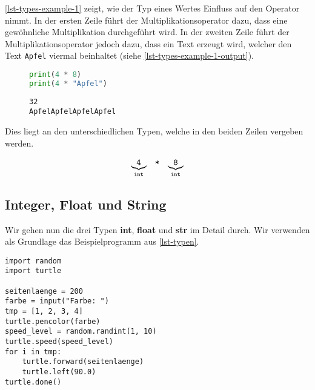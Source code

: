\begin{example}

\autoref{lst-types-example-1} zeigt, wie der Typ eines Wertes Einfluss auf den Operator nimmt. In der ersten Zeile führt der Multiplikationsoperator dazu, dass eine gewöhnliche Multiplikation durchgeführt wird. In der zweiten Zeile führt der Multiplikationsoperator jedoch dazu, dass ein Text erzeugt wird, welcher den Text \lstinline{Apfel} viermal beinhaltet (siehe \autoref{lst-types-example-1-output}).

\begin{figure}[htb]
\begin{minipage}{0.45\textwidth}
\begin{lstlisting}[language=python, label={lst-types-example-1}, caption={Beide Zeilen verwenden den Multiplikationsoperator.}]
print(4 * 8)
print(4 * "Apfel")
\end{lstlisting}
\end{minipage}
\hfill
\begin{minipage}{0.45\textwidth}
\begin{lstlisting}[language=output, label={lst-types-example-1-output}, caption={Gewöhnliche Multiplikation und Wiederholung des Texts.}]
32
ApfelApfelApfelApfel
\end{lstlisting}
\end{minipage}
\end{figure}

Dies liegt an den unterschiedlichen Typen, welche in den beiden Zeilen vergeben werden.

\begin{minipage}{0.45\textwidth}
$$
\begin{array}[t]{ccc}
\underbrace{\texttt{4}}_{\texttt{int}} & \texttt{*} & \underbrace{\texttt{8}}_{\texttt{int}}
\end{array}
$$
\end{minipage}

\end{example}

\subsection{Integer, Float und String}

Wir gehen nun die drei Typen \textbf{int}, \textbf{float} und \textbf{str} im Detail durch. Wir verwenden als Grundlage das Beispielprogramm aus \autoref{lst-typen}.	

\begin{lstlisting}[caption={Ein farbiges Quadrat (\graybgtexttt{beispiel\_typen.py}).}, label=lst-typen, showstringspaces=false]
import random
import turtle

seitenlaenge = 200
farbe = input("Farbe: ")
tmp = [1, 2, 3, 4]
turtle.pencolor(farbe)
speed_level = random.randint(1, 10)
turtle.speed(speed_level)
for i in tmp:
    turtle.forward(seitenlaenge)
    turtle.left(90.0)
turtle.done()
\end{lstlisting}

